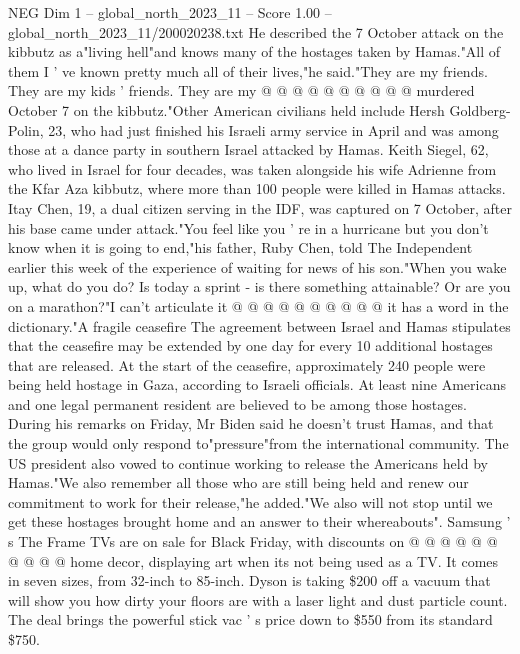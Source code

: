 \begin{textsample}{NEG Dim 1 – global\_north\_2023\_11 – Score 1.00 – global\_north\_2023\_11/200020238.txt}
He described the 7 October attack on the kibbutz as a"living hell"and knows many of the hostages taken by Hamas."All of them I ' ve known pretty much all of their lives,"he said."They are my friends.
They are my kids ' friends.
They are my @ @ @ @ @ @ @ @ @ @ murdered October 7 on the kibbutz."Other American civilians held include Hersh Goldberg-Polin, 23, who had just finished his Israeli army service in April and was among those at a dance party in southern Israel attacked by Hamas.
Keith Siegel, 62, who lived in Israel for four decades, was taken alongside his wife Adrienne from the Kfar Aza kibbutz, where more than 100 people were killed in Hamas attacks.
Itay Chen, 19, a dual citizen serving in the IDF, was captured on 7 October, after his base came under attack."You feel like you ' re in a hurricane but you don't know when it is going to end,"his father, Ruby Chen, told The Independent earlier this week of the experience of waiting for news of his son."When you wake up, what do you do?
Is today a sprint - is there something attainable?
Or are you on a marathon?"I can't articulate it @ @ @ @ @ @ @ @ @ @ it has a word in the dictionary."A fragile ceasefire The agreement between Israel and Hamas stipulates that the ceasefire may be extended by one day for every 10 additional hostages that are released.
At the start of the ceasefire, approximately 240 people were being held hostage in Gaza, according to Israeli officials.
At least nine Americans and one legal permanent resident are believed to be among those hostages.
During his remarks on Friday, Mr Biden said he doesn't trust Hamas, and that the group would only respond to"pressure"from the international community.
The US president also vowed to continue working to release the Americans held by Hamas."We also remember all those who are still being held and renew our commitment to work for their release,"he added."We also will not stop until we get these hostages brought home and an answer to their whereabouts".
Samsung ' s The Frame TVs are on sale for Black Friday, with discounts on @ @ @ @ @ @ @ @ @ @ home decor, displaying art when its not being used as a TV.
It comes in seven sizes, from 32-inch to 85-inch.
Dyson is taking \$200 off a vacuum that will show you how dirty your floors are with a laser light and dust particle count.
The deal brings the powerful stick vac ' s price down to \$550 from its standard \$750.

\end{textsample}
